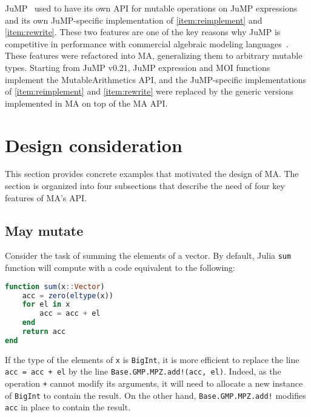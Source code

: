 \documentclass{juliacon}
\begin{document}
JuMP~\cite{dunning2017jump} used to have its own API for mutable operations on JuMP expressions and
its own JuMP-specific implementation of \ref{item:reimplement} and \ref{item:rewrite}.
These two features are one of the key reasons why JuMP is competitive in performance with commercial algebraic modeling languages~\cite[Section~3--4]{dunning2017jump}.
These features were refactored into MA, generalizing them to arbitrary mutable types.
Starting from JuMP v0.21, JuMP expression and MOI functions implement the MutableArithmetics API, and
the JuMP-specific implementations of \ref{item:reimplement} and \ref{item:rewrite} were replaced by the generic versions implemented in MA on top of the MA API.

\section{Design consideration}
This section provides concrete examples that motivated the design of MA.
The section is organized into four subsections that describe the need of four key features of MA's API.

\subsection{May mutate}
Consider the task of summing the elements of a vector.
By default, Julia \texttt{sum} function will compute with a code equivalent to the following:
\begin{lstlisting}[language = Julia]
function sum(x::Vector)
    acc = zero(eltype(x))
    for el in x
        acc = acc + el
    end
    return acc
end
\end{lstlisting}
If the type of the elements of \texttt{x} is \texttt{BigInt}, it is more efficient to replace the line
\lstinline|acc = acc + el| by the line
\lstinline|Base.GMP.MPZ.add!(acc, el)|.
Indeed, as the operation \lstinline|+| cannot modify its arguments,
it will need to allocate a new instance of \texttt{BigInt} to contain the result.
On the other hand, \lstinline|Base.GMP.MPZ.add!| modifies \lstinline|acc| in place to contain the result.
\end{document}
